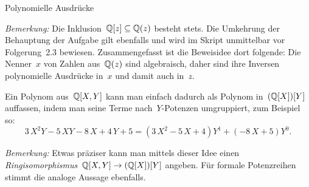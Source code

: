 \documentclass{algblatt}
\begin{document}
\begin{aufgabe}{Polynomielle Ausdrücke}
\begin{loesungE}
\emph{Bemerkung:} Die Inklusion~$\mathbb{Q}[z] \subseteq \mathbb{Q}(z)$ besteht stets. Die
Umkehrung der Behauptung der Aufgabe gilt ebenfalls und wird im Skript
unmittelbar vor Folgerung~2.3 bewiesen. Zusammengefasst ist die Beweisidee
dort folgende: Die Nenner~$x$ von Zahlen aus~$\mathbb{Q}(z)$ sind algebraisch, daher sind
ihre Inversen polynomielle Ausdrücke in~$x$ und damit auch in~$z$.

\item Ein Polynom aus~$\mathbb{Q}[X,Y]$ kann man einfach dadurch als Polynom
in~$(\mathbb{Q}[X])[Y]$ auffassen, indem man seine Terme nach~$Y$-Potenzen
umgruppiert, zum Beispiel so:
\[ 3\,X^2Y - 5\,XY - 8\,X + 4\,Y + 5 =
  (3\,X^2 - 5\,X + 4) Y^1 + (-8\,X + 5) Y^0. \]

\emph{Bemerkung:} Etwas präziser kann man mittels dieser Idee einen
\emph{Ringisomorphismus}~$\mathbb{Q}[X,Y] \to (\mathbb{Q}[X])[Y]$ angeben. Für formale
Potenzreihen stimmt die analoge Aussage ebenfalls.
\end{loesungE}
\end{aufgabe}
\end{document}
